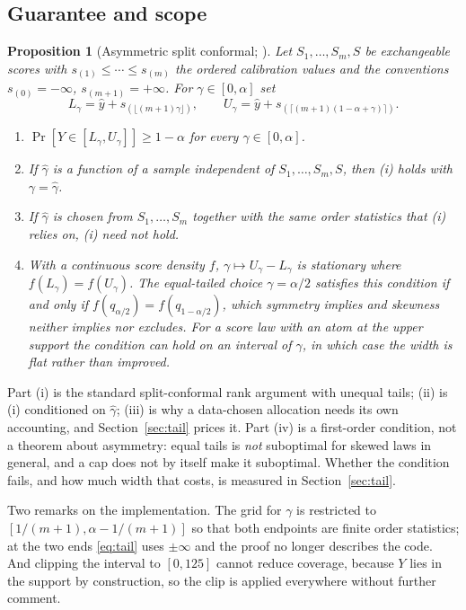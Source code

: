 \documentclass[journal]{IEEEtran}
\newtheorem{proposition}{Proposition}
\begin{document}
\subsection{Guarantee and scope}\label{sec:prop}

\begin{proposition}[Asymmetric split conformal; \cite{vovk2005,romano2019}]
\label{prop:tail}
Let $S_1,\dots,S_m,S$ be exchangeable scores with $s_{(1)}\le\cdots\le s_{(m)}$ the ordered
calibration values and the conventions $s_{(0)}=-\infty$, $s_{(m+1)}=+\infty$. For
$\gamma\in[0,\alpha]$ set
\begin{equation}
L_\gamma=\hat y+s_{(\lfloor(m+1)\gamma\rfloor)},\qquad
U_\gamma=\hat y+s_{(\lceil(m+1)(1-\alpha+\gamma)\rceil)} .
\label{eq:tail}
\end{equation}
\begin{enumerate}
\item[(i)] $\Pr[Y\in[L_\gamma,U_\gamma]]\ge1-\alpha$ for every $\gamma\in[0,\alpha]$.
\item[(ii)] If $\hat\gamma$ is a function of a sample independent of $S_1,\dots,S_m,S$, then
(i) holds with $\gamma=\hat\gamma$.
\item[(iii)] If $\hat\gamma$ is chosen from $S_1,\dots,S_m$ together with the same order
statistics that (i) relies on, (i) need not hold.
\item[(iv)] With a continuous score density $f$, $\gamma\mapsto U_\gamma-L_\gamma$ is
stationary where $f(L_\gamma)=f(U_\gamma)$. The equal-tailed choice $\gamma=\alpha/2$
satisfies this condition if and only if $f(q_{\alpha/2})=f(q_{1-\alpha/2})$, which symmetry
implies and skewness neither implies nor excludes. For a score law with an atom at the upper
support the condition can hold on an interval of $\gamma$, in which case the width is flat
rather than improved.
\end{enumerate}
\end{proposition}

Part (i) is the standard split-conformal rank argument with unequal tails; (ii) is (i)
conditioned on $\hat\gamma$; (iii) is why a data-chosen allocation needs its own accounting,
and Section~\ref{sec:tail} prices it. Part (iv) is a first-order condition, not a theorem
about asymmetry: equal tails is \emph{not} suboptimal for skewed laws in general, and a cap
does not by itself make it suboptimal. Whether the condition fails, and how much width that
costs, is measured in Section~\ref{sec:tail}.

Two remarks on the implementation. The grid for $\gamma$ is restricted to
$[1/(m+1),\alpha-1/(m+1)]$ so that both endpoints are finite order statistics; at the two ends
\eqref{eq:tail} uses $\pm\infty$ and the proof no longer describes the code. And clipping the
interval to $[0,125]$ cannot reduce coverage, because $Y$ lies in the support by construction,
so the clip is applied everywhere without further comment.
\end{document}
